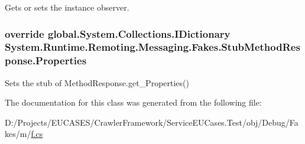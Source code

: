 Gets or sets the instance observer.

\hypertarget{class_system_1_1_runtime_1_1_remoting_1_1_messaging_1_1_fakes_1_1_stub_method_response_a5db6ad724af326ead96694eb284da3b7}{
\subsubsection[{Properties}]{\setlength{\rightskip}{0pt plus 5cm}override global.\-System.\-Collections.\-I\-Dictionary System.\-Runtime.\-Remoting.\-Messaging.\-Fakes.\-Stub\-Method\-Response.\-Properties\hspace{0.3cm}{\ttfamily [get]}}}\label{class_system_1_1_runtime_1_1_remoting_1_1_messaging_1_1_fakes_1_1_stub_method_response_a5db6ad724af326ead96694eb284da3b7}


Sets the stub of Method\-Response.\-get\-\_\-\-Properties()



The documentation for this class was generated from the following file\-:\begin{DoxyCompactItemize}
\item 
D\-:/\-Projects/\-E\-U\-C\-A\-S\-E\-S/\-Crawler\-Framework/\-Service\-E\-U\-Cases.\-Test/obj/\-Debug/\-Fakes/m/\hyperlink{m_2f_8cs}{f.\-cs}\end{DoxyCompactItemize}
